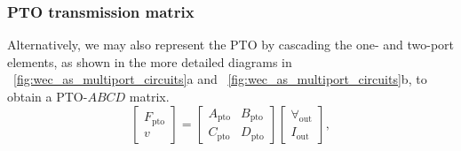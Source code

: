 \documentclass[lettersize,journal]{IEEEtran}
\begin{document}
\subsubsection{PTO transmission matrix}\label{sec:pto_transmission_matrix}
Alternatively, we may also represent the PTO by cascading the one- and two-port elements, as shown in the more detailed diagrams in \figurename~\ref{fig:wec_as_multiport_circuits}a and \figurename~\ref{fig:wec_as_multiport_circuits}b, to obtain a PTO-$ABCD$ matrix.
%
\begin{equation}
	\label{eq:pto_ABCD_mat_def}
	\begin{bmatrix} 
		F_{\textrm{pto}} \\
		v 
	\end{bmatrix} 
	= 
        \begin{bmatrix} 
	A_{\textrm{pto}} & B_{\textrm{pto}} \\ 
	C_{\textrm{pto}} & D_{\textrm{pto}} 
        \end{bmatrix}
	\begin{bmatrix} 
		\forall_{\textrm{out}} \\
		I_{\textrm{out}} 
	\end{bmatrix},
\end{equation}
\end{document}
